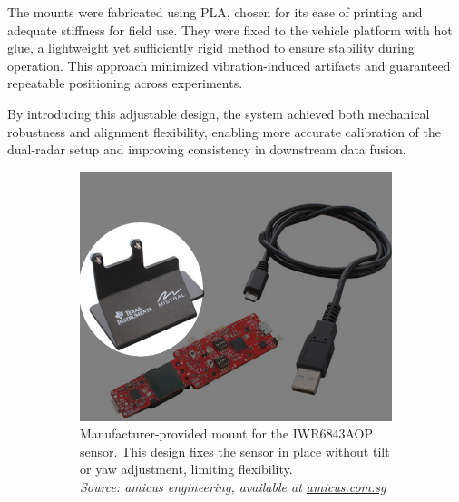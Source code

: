 The mounts were fabricated using PLA, chosen for its ease of printing and adequate stiffness for field use. 
They were fixed to the vehicle platform with hot glue, a lightweight yet sufficiently rigid method to ensure stability during operation. 
This approach minimized vibration-induced artifacts and guaranteed repeatable positioning across experiments.  

By introducing this adjustable design, the system achieved both mechanical robustness and alignment flexibility, enabling more accurate calibration of the dual-radar setup and improving consistency in downstream data fusion.  

\begin{figure}[!htbp]
    \centering
    \begin{subfigure}[t]{0.48\linewidth}
        \centering
        \includegraphics[width=\linewidth]{images/IWR6843Mount.png}
        \caption{Manufacturer-provided mount for the IWR6843AOP sensor. This design fixes the sensor in place without tilt or yaw adjustment, limiting flexibility.\\
        \textit{Source: amicus engineering, available at \href{https://amicus.com.sg/products/iwr6843aop-evaluation-module-for-single-chip-60ghz-antenna-on-package-aop-mmwave-sensor/}{amicus.com.sg}}}
        \label{fig:IWR6843AOP_mount}
    \end{subfigure}
    \hfill
    \begin{subfigure}[t]{0.48\linewidth}
        \centering

\end{subfigure}
\end{figure}
